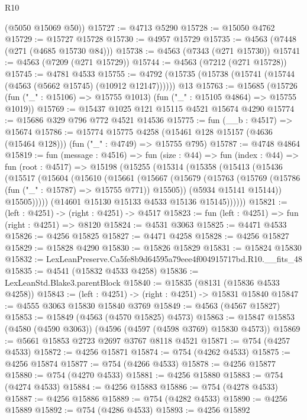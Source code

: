 \begin{lexlean}{R10}
\begin{coremodule}
      (@5050 @15069 @50))
@15727 := @4713 @5290
@15728 := @15050 @4762
@15729 := @15727 @15728
@15730 := @4957 @15729
@15735 := @4563 (@7448 (@271 (@4685 @15730 @84)))
@15738 := @4563 (@7343 (@271 @15730))
@15741 := @4563 (@7209 (@271 @15729))
@15744 := @4563 (@7212 (@271 @15728))
@15745 := @4781 @4533
@15755 := @4792 (@15735 (@15738 (@15741 (@15744 (@4563 (@5662 @15745) (@10912 @12147)))))) @13
@15763 := @15685
    (@15726 (fun ("_" : @15106) => @15755 @1013) (fun ("_" : @15105 @4864) => @15755 @1019))
@15769 := @15437 @1025 @121 @15115 @4521 @15674 @4290
@15774 := @15686 @329 @796 @772 @4521 @14536
@15775 := fun (__b : @4517) => @15674
@15786 := @15774
    @15775
    @4258
    (@15461 @128 @15157 (@4636 (@15464 @128)))
    (fun ("_" : @4749) => @15755 @795)
@15787 := @4748 @4864
@15819 := fun (message : @4516) =>
  fun (size : @44) =>
  fun (index : @44) =>
  fun (root : @4517) =>
  @15198
    (@15255
      (@15314
        (@15358
          (@15413
            (@15436
              (@15517
                (@15604
                  (@15610
                    (@15661
                      (@15667
                        (@15679
                          (@15763 (@15769 (@15786 (fun ("_" : @15787) => @15755 @771)) @15505))
                          (@5934 @15141 @15144))
                        @15505)))))
              (@14601 @15130 @15133 @4533 @15136 @15145))))))
@15821 := (left : @4251) -> (right : @4251) -> @4517
@15823 := fun (left : @4251) => fun (right : @4251) => @8120
@15824 := @4531 @3063
@15825 := @4471 @4533
@15826 := @4256 @15825
@15827 := @4471 @4258
@15828 := @4256 @15827
@15829 := @15828 @4290
@15830 := @15826 @15829
@15831 := @15824 @15830
@15832 := LexLeanPreserve.Ca5fe8b9d64595a79eee4f004915717bd.R10.__fits_48
@15835 := @4541 (@15832 @4533 @4258)
@15836 := LexLeanStd.Blake3.parentBlock
@15840 := @15835 (@8131 (@15836 @4533 @4258))
@15843 := (left : @4251) -> (right : @4251) -> @15831 @15840
@15847 := @4555 @3063 @15830 @15840 @3769
@15849 := @4563 (@4567 @15827)
@15853 := @15849 (@4563 (@4570 @15825) @4573)
@15863 := @15847 @15853 (@4580 (@4590 @3063)) (@4596 (@4597 (@4598 @3769) @15830 @4573))
@15869 := @5661 @15853 @2723 @2697 @3767 @8118 @4521
@15871 := @754 (@4257 @4533)
@15872 := @4256 @15871
@15874 := @754 (@4262 @4533)
@15875 := @4256 @15874
@15877 := @754 (@4266 @4533)
@15878 := @4256 @15877
@15880 := @754 (@4270 @4533)
@15881 := @4256 @15880
@15883 := @754 (@4274 @4533)
@15884 := @4256 @15883
@15886 := @754 (@4278 @4533)
@15887 := @4256 @15886
@15889 := @754 (@4282 @4533)
@15890 := @4256 @15889
@15892 := @754 (@4286 @4533)
@15893 := @4256 @15892

\end{coremodule}
\end{lexlean}
